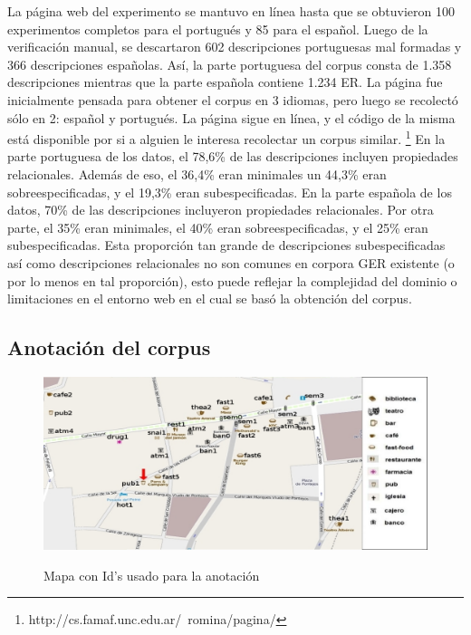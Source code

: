 La p\'agina web del experimento se mantuvo en l\'{i}nea hasta que se obtuvieron 100 experimentos completos para el portugu\'es y 85  para el espa\~nol. Luego de la verificaci\'on manual, se descartaron 602 descripciones portuguesas mal formadas y 366 descripciones espa\~nolas. As\'{i}, la parte portuguesa del corpus consta de 1.358 descripciones mientras que la parte espa\~nola contiene 1.234 ER. La p\'agina fue inicialmente pensada para obtener el corpus en 3 idiomas, pero luego se recolect\'o s\'olo en 2: espa\~nol y portugu\'es. La p\'agina sigue en l\'inea, y el c\'odigo de la misma est\'a disponible por si a alguien le interesa recolectar un corpus similar.
\footnote{http://cs.famaf.unc.edu.ar/~romina/pagina/}
En la parte portuguesa de los datos, el 78,6\% de las descripciones incluyen propiedades relacionales. Adem\'as de eso, el 36,4\% eran minimales un 44,3\% eran sobreespecificadas, y el 19,3\% eran subespecificadas. En la parte espa\~nola de los datos, 70\% de las descripciones incluyeron propiedades relacionales. Por otra parte, el 35\% eran minimales, el 40\% eran sobreespecificadas, y el 25\% eran subespecificadas.
Esta proporci\'on tan grande de descripciones subespecificadas as\'{i} como descripciones relacionales no son comunes en corpora GER existente (o por lo menos en tal proporci\'on), esto puede reflejar la complejidad del dominio o limitaciones en el entorno web en el cual se bas\'o la obtenci\'on del corpus.



\subsection{Anotaci\'on del corpus}
\label{corpus-anotacion}

\begin{figure}[H]
\centering
\includegraphics[width=\textwidth]{figures/mapa-con-ids2.png}\\[0pt]
\caption{Mapa con Id's usado para la anotaci\'on}
\label{mapa-con-ids}
\end{figure}

